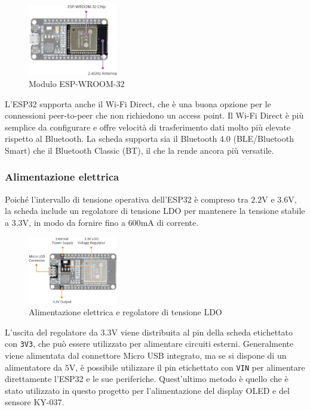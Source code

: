 \documentclass[a4paper,12pt]{report}  %
\newcommand{\lstinlinebg}[1]{\colorbox{backcolour}{\lstinline|#1|}}
\begin{document}
\begin{figure}[h]
    \centering
    \includegraphics[width=0.35\textwidth]{imgs/ESP32-Hardware-Specifications-ESP-WROOM-32-Chip.jpg}
    \caption{Modulo ESP-WROOM-32}
    \label{fig:ESP-WROOM-32}
\end{figure}

L'ESP32 supporta anche il Wi-Fi Direct, che è una buona opzione per le connessioni peer-to-peer che non richiedono un access point.
Il Wi-Fi Direct è più semplice da conﬁgurare e offre velocità di trasferimento dati molto più elevate rispetto al Bluetooth.
La scheda supporta sia il Bluetooth 4.0 (BLE/Bluetooth Smart) che il Bluetooth Classic (BT), il che la rende ancora più versatile.

\subsubsection{Alimentazione elettrica}
Poiché l'intervallo di tensione operativa dell'ESP32 è compreso tra $2.2 \text{V}$ e $3.6 \text{V}$, la scheda include un regolatore di tensione LDO per mantenere la tensione stabile a $3.3 \text{V}$, in modo da fornire fino a $600 \text{mA}$ di corrente.

\begin{figure}[h]
    \centering
    \includegraphics[width=0.35\textwidth]{imgs/ESP32-Hardware-Specifications-Power-Supply.jpg}
    \caption{Alimentazione elettrica e regolatore di tensione LDO}
    \label{fig:ESP32-LDO}
\end{figure}

L'uscita del regolatore da $3.3 \text{V}$ viene distribuita al pin della scheda etichettato con \lstinlinebg{3V3}, che può essere utilizzato per alimentare circuiti esterni.
Generalmente viene alimentata dal connettore Micro USB integrato, ma se si dispone di un alimentatore da $5 \text{V}$, è possibile utilizzare il pin etichettato con \lstinlinebg{VIN} per alimentare direttamente l'ESP32 e le sue periferiche.
Quest'ultimo metodo è quello che è stato utilizzato in questo progetto per l'alimentazione del display OLED e del sensore KY-037.
\end{document}
